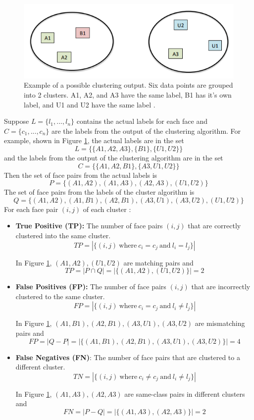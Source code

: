 \documentclass[12pt,english]{article}
\begin{document}
\begin{figure}[!tbp]
 \centering
    \includegraphics[width=\columnwidth]{figures/fmeasure.png}
    \caption{Example of a possible clustering output. Six data points are grouped into 2 clusters. A1, A2, and A3 have the same label, B1 has it's own label, and U1 and U2 have the same label \cite{otto}.}
    \label{fig:fmeasure}
\end{figure}
\quad
Suppose $L = \{l_{1},...,l_{n}\}$ contains the actual labels for each face and $C = \{c_{1},...,c_{n}\}$ are the labels from the output of the clustering algorithm. For example, shown in Figure \ref{fig:fmeasure}, the actual labels are in the set $$L = \{\{A1, A2, A3\}, \{B1\}, \{U1, U2\}\}$$ and the labels from the output of the clustering algorithm are in the set $$C = \{\{A1, A2, B1\}, \{A3, U1, U2 \}\}$$
Then the set of face pairs from the actual labels is $$P = \{(A1, A2), (A1, A3), (A2, A3), (U1, U2)\}$$ 
The set of face pairs from the labels of the cluster algorithm is $$Q = \{(A1, A2), (A1, B1), (A2, B1), (A3, U1), (A3, U2), (U1, U2)\}$$
For each face pair $(i, j)$ of each cluster \cite{thesis}: \\
\begin{itemize}
\item \textbf{True Positive (TP):} The number of face pairs $(i, j)$ that are correctly clustered into the same cluster.
$$TP = | \{(i, j) \ \textrm{where} \ c_{i} = c_{j} \ \textrm{and} \ l_{i} = l_{j}\}|$$

In Figure \ref{fig:fmeasure}, $(A1, A2), (U1, U2)$ are matching pairs and
$$TP = | P \cap Q | = |\{(A1, A2), (U1, U2)\}| = 2$$

\item \textbf{False Positives (FP):} The number of face pairs $(i, j)$ that are incorrectly clustered to the same cluster. $$FP = | \{(i, j) \ \textrm{where} \ c_{i} = c_{j} \ \textrm{and} \ l_{i} \neq l_{j}\}|$$

In Figure \ref{fig:fmeasure}, $(A1, B1), (A2, B1), (A3, U1), (A3, U2)$ are mismatching pairs and $$FP = |Q - P| = |\{(A1, B1), (A2, B1), (A3, U1), (A3, U2)\}| = 4$$ 

\item \textbf{False Negatives (FN)}: The number of face pairs that are clustered to a different cluster. $$TN = | \{(i, j) \ \textrm{where} \ c_{i} \neq c_{j} \ \textrm{and} \ l_{i} \neq l_{j}\}|$$

In Figure \ref{fig:fmeasure}, $(A1, A3), (A2, A3)$ are same-class pairs in different clusters and $$FN = |P - Q| = |\{(A1, A3), (A2, A3)\}| = 2$$
\end{itemize}
\end{document}
